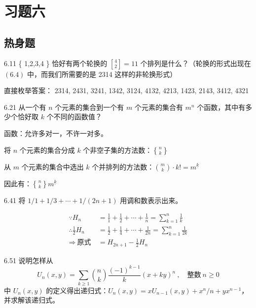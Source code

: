 \section{习题六}

\subsection{热身题}

\begin{problem}{6.1}{1}
  \{ 1,2,3,4 \} 恰好有两个轮换的 \( \genfrac{[}{]}{0pt}{} {4}{2} = 11 \) 个排列是什么？（轮换的形式出现在 \( (6.4) \) 中，而我们所需要的是 2314 这样的非轮换形式）
\end{problem}

直接枚举答案：
2314, 2431, 3241, 1342, 3124, 4132, 4213, 1423, 2143, 3412, 4321

\begin{problem}{6.2}{1}
  从一个有 \( n \) 个元素的集合到一个有 \( m \) 个元素的集合有 \( m^n \) 个函数，其中有多少个恰好取 \( k \) 个不同的函数值？
\end{problem}

函数：允许多对一，不许一对多。

将 \( n \) 个元素的集合分成 \( k \) 个非空子集的方法数：\( \displaystyle\genfrac{\{}{\}}{0pt}{} {n}{k} \)

从 \( m \) 个元素的集合中选出 \( k \) 个并排列的方法数：\( \displaystyle\binom{m}{k} \cdot k! = m^{\underline{k}} \)

因此有：\( \displaystyle\genfrac{\{}{\}}{0pt}{} {n}{k} m^{\underline{k}} \)

\begin{problem}{6.4}{1}
  将 \( 1/1 + 1/3 + \cdots + 1/(2n+1) \) 用调和数表示出来。
\end{problem}

\begin{align*}
  \because H_n &= \frac{1}{1} + \frac{1}{2} + \cdots + \frac{1}{n} = \sum_{k=1}^n \frac{1}{k} \\
  \therefore \frac{1}{2} H_n &= \frac{1}{2} + \frac{1}{4} + \cdots + \frac{1}{2n} = \sum_{k=1}^n \frac{1}{2k} \\
  \Rightarrow \ \text{原式} \ &= H_{2n+1} - \frac{1}{2} H_n
\end{align*}

\begin{problem}{6.5}{1}
  说明怎样从
  \[
    U_n(x,y) = \sum_{k \ge 1} \binom{n}{k} \frac{(-1)^{k-1}}{k} (x+ky)^n \ , \quad \text{整数} \ n \ge 0
  \]
  中 \( U_n(x,y) \) 的定义得出递归式：\( U_n(x,y) = x U_{n-1}(x,y) + x^n / n + yx^{n-1} \)，并求解该递归式。
\end{problem}

